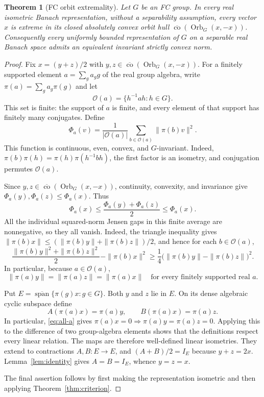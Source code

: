 \documentclass[11pt,letterpaper]{amsart}
\newtheorem{theorem}{Theorem}[section]
\theoremstyle{definition}
\theoremstyle{remark}
\DeclareMathOperator{\co}{co}
\DeclareMathOperator{\Orb}{Orb}
\DeclareMathOperator{\Span}{span}
\begin{document}
\begin{theorem}[FC orbit extremality]\label{thm:fc}
Let $G$ be an FC group. In every real isometric Banach representation,
without a separability assumption, every vector $x$ is extreme in its
closed absolutely convex orbit hull $\overline{\co}(\Orb_G(x,-x))$. Consequently
every uniformly bounded representation of $G$ on a separable real
Banach space admits an equivalent invariant strictly convex norm.
\end{theorem}
\begin{proof}
Fix $x=(y+z)/2$ with $y,z\in \overline{\co}(\Orb_G(x,-x))$. For a finitely supported element
$a=\sum_g a_g g$ of the real group algebra, write
$\pi(a)=\sum_g a_g\pi(g)$ and let
\[
 \mathcal O(a)=\{h^{-1}ah:h\in G\}.
\]
This set is finite: the support of $a$ is finite, and every element of
that support has finitely many conjugates. Define
\[
 \Phi_a(v)=\frac1{|\mathcal O(a)|}
                  \sum_{b\in\mathcal O(a)}\|\pi(b)v\|^2.
\]
This function is continuous, even, convex, and $G$-invariant. Indeed,
$\pi(b)\pi(h)=\pi(h)\pi(h^{-1}bh)$, the first factor is an isometry,
and conjugation permutes $\mathcal O(a)$.

Since $y,z\in \overline{\co}(\Orb_G(x,-x))$, continuity, convexity, and invariance give
$\Phi_a(y),\Phi_a(z)\leq\Phi_a(x)$. Thus
\[
 \Phi_a(x)\leq\frac{\Phi_a(y)+\Phi_a(z)}2\leq\Phi_a(x).
\]
All the individual squared-norm Jensen gaps in this finite average are
nonnegative, so they all vanish. Indeed, the triangle inequality gives
$\|\pi(b)x\|\leq(\|\pi(b)y\|+\|\pi(b)z\|)/2$, and hence
for each $b\in\mathcal O(a)$,
\[
 \frac{\|\pi(b)y\|^2+\|\pi(b)z\|^2}{2}-\|\pi(b)x\|^2
 \geq\frac14\bigl(\|\pi(b)y\|-\|\pi(b)z\|\bigr)^2.
\]
In particular, because $a\in\mathcal O(a)$,
\begin{equation}\label{eq:all-a}
 \|\pi(a)y\|=\|\pi(a)z\|=\|\pi(a)x\|
 \quad\text{for every finitely supported real }a.
\end{equation}

Put $E=\overline{\Span}\{\pi(g)x:g\in G\}$. Both $y$ and $z$ lie
in $E$. On its dense algebraic cyclic subspace define
\[
 A(\pi(a)x)=\pi(a)y,\qquad B(\pi(a)x)=\pi(a)z.
\]
In particular, \eqref{eq:all-a} gives
$\pi(a)x=0\Rightarrow\pi(a)y=\pi(a)z=0$. Applying this to the
difference of two group-algebra elements shows that the definitions
respect every linear relation. The maps are therefore well-defined
linear isometries. They extend to contractions $A,B:E\to E$, and
$(A+B)/2=I_E$ because $y+z=2x$. Lemma~\ref{lem:identity} gives
$A=B=I_E$, whence $y=z=x$.

The final assertion follows by first making the representation isometric
and then applying Theorem~\ref{thm:criterion}.
\end{proof}
\end{document}
